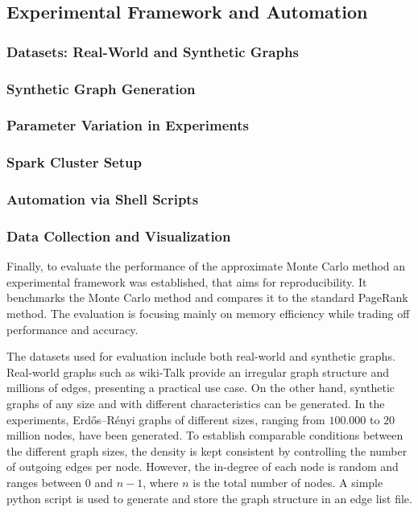 \subsection{Experimental Framework and Automation}

\subsubsection{Datasets: Real-World and Synthetic Graphs}
\subsubsection{Synthetic Graph Generation}
\subsubsection{Parameter Variation in Experiments}
\subsubsection{Spark Cluster Setup}
\subsubsection{Automation via Shell Scripts}
\subsubsection{Data Collection and Visualization}

Finally, to evaluate the performance of the approximate Monte Carlo method an experimental framework was established, that aims for reproducibility. It benchmarks the Monte Carlo method and compares it to the standard PageRank method. The evaluation is focusing mainly on memory efficiency while trading off performance and accuracy. \par
The datasets used for evaluation include both real-world and synthetic graphs. Real-world graphs such as wiki-Talk provide an irregular graph structure and millions of edges, presenting a practical use case. On the other hand, synthetic graphs of any size and with different characteristics can be generated. In the experiments, Erdős–Rényi graphs of different sizes, ranging from $100.000$ to $20$ million nodes, have been generated. To establish comparable conditions between the different graph sizes, the density is kept consistent by controlling the number of outgoing edges per node. However, the in-degree of each node is random and ranges between $0$ and $n-1$, where $n$ is the total number of nodes. A simple python script is used to generate and store the graph structure in an edge list file.

